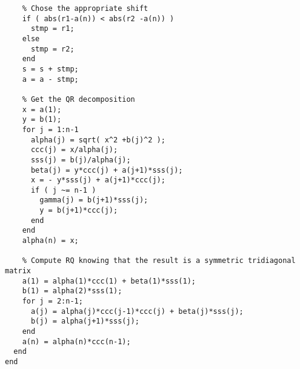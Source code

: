 \begin{code}
\begin{verbatim}
    % Chose the appropriate shift
    if ( abs(r1-a(n)) < abs(r2 -a(n)) )
      stmp = r1;
    else
      stmp = r2;
    end
    s = s + stmp;
    a = a - stmp;

    % Get the QR decomposition
    x = a(1);
    y = b(1);
    for j = 1:n-1
      alpha(j) = sqrt( x^2 +b(j)^2 );
      ccc(j) = x/alpha(j);
      sss(j) = b(j)/alpha(j);
      beta(j) = y*ccc(j) + a(j+1)*sss(j);
      x = - y*sss(j) + a(j+1)*ccc(j);
      if ( j ~= n-1 )
        gamma(j) = b(j+1)*sss(j);
        y = b(j+1)*ccc(j);
      end
    end
    alpha(n) = x;

    % Compute RQ knowing that the result is a symmetric tridiagonal matrix
    a(1) = alpha(1)*ccc(1) + beta(1)*sss(1);
    b(1) = alpha(2)*sss(1);
    for j = 2:n-1;
      a(j) = alpha(j)*ccc(j-1)*ccc(j) + beta(j)*sss(j);
      b(j) = alpha(j+1)*sss(j);
    end
    a(n) = alpha(n)*ccc(n-1);
  end
end
\end{verbatim}
\end{code}

